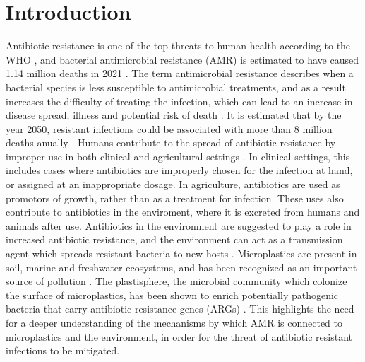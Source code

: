 \chapter{Introduction}


Antibiotic resistance is one of the top threats to human health according to the WHO \cite{worldhealthorganization2023AntimicrobialResistance}, and bacterial antimicrobial resistance (AMR) is estimated to have caused 1.14 million deaths in 2021 \cite{naghavi2024GlobalBurdenBacterial}.
The term antimicrobial resistance describes when a bacterial species is less susceptible to antimicrobial treatments, and as a result increases the difficulty of treating the infection, which can lead to an increase in disease spread, illness and potential risk of death \cite{worldhealthorganization2023AntimicrobialResistance}.
It is estimated that by the year 2050, resistant infections could be associated with more than 8 million deaths anually \cite{naghavi2024GlobalBurdenBacterial}.
Humans contribute to the spread of antibiotic resistance by improper use in both clinical and agricultural settings \cite{marston2016AntimicrobialResistance, ding2023SpreadAntibioticResistance}. 
In clinical settings, this includes cases where antibiotics are improperly chosen for the infection at hand, or assigned at an inappropriate dosage.
In agriculture, antibiotics are used as promotors of growth, rather than as a treatment for infection.
These uses also contribute to antibiotics in the enviroment, where it is excreted from humans and animals after use.
Antibiotics in the environment are suggested to play a role in increased antibiotic resistance, and the environment can act as a transmission agent which spreads resistant bacteria to new hosts \cite{larsson2022AntibioticResistanceEnvironment}.
Microplastics are present in soil, marine and freshwater ecosystems, and has been recognized as an important source of pollution \cite{ziani2023MicroplasticsRealGlobal}. 
The plastisphere, the microbial community which colonize the surface of microplastics, has been shown to enrich potentially pathogenic bacteria that carry antibiotic resistance genes (ARGs) \cite{liu2021MicroplasticsAreHotspot, wu2019SelectiveEnrichmentBacterial}.
This highlights the need for a deeper understanding of the mechanisms by which AMR is connected to microplastics and the environment, in order for the threat of antibiotic resistant infections to be mitigated. 

